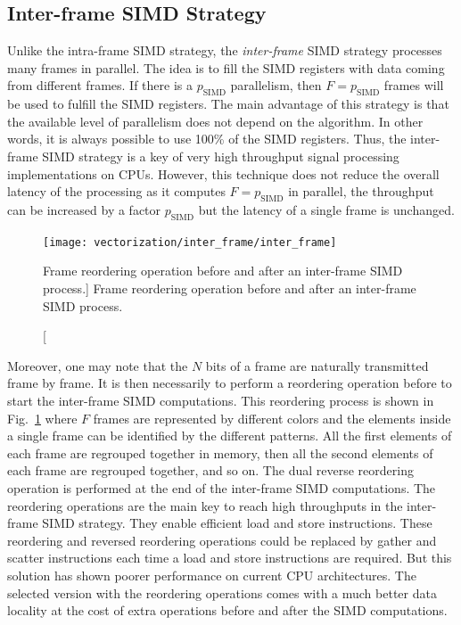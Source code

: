 \subsection{Inter-frame SIMD Strategy}
\label{sec:opt_vec_inter}

Unlike the intra-frame SIMD strategy, the \emph{inter-frame} SIMD strategy
processes many frames in parallel. The idea is to fill the SIMD registers with
data coming from different frames. If there is a $p_\text{SIMD}$ parallelism,
then $F = p_\text{SIMD}$ frames will be used to fulfill the SIMD registers. The
main advantage of this strategy is that the available level of parallelism does
not depend on the algorithm. In other words, it is always possible to use 100\%
of the SIMD registers. Thus, the inter-frame SIMD strategy is a key of very high
throughput signal processing implementations on CPUs. However, this technique
does not reduce the overall latency of the processing as it computes $F =
p_\text{SIMD}$ in parallel, the throughput can be increased by a factor
$p_\text{SIMD}$ but the latency of a single frame is unchanged.

\begin{figure}[htp]
  \centering
  \texttt{[image: vectorization/inter\_frame/inter\_frame]}
  \caption
    [Frame reordering operation before and after an inter-frame SIMD process.]
    {Frame reordering operation before and after an inter-frame SIMD process.}
  \label{fig:opt_vec_inter_frame}
\end{figure}

Moreover, one may note that the $N$ bits of a frame are naturally transmitted
frame by frame. It is then necessarily to perform a reordering operation before
to start the inter-frame SIMD computations. This reordering process is shown in
Fig.~\ref{fig:opt_vec_inter_frame} where $F$ frames are represented by different
colors and the elements inside a single frame can be identified by the different
patterns. All the first elements of each frame are regrouped together in memory,
then all the second elements of each frame are regrouped together, and so on.
The dual reverse reordering operation is performed at the end of the inter-frame
SIMD computations. The reordering operations are the main key to reach high
throughputs in the inter-frame SIMD strategy. They enable efficient load and
store instructions. These reordering and reversed reordering operations could be
replaced by gather and scatter instructions each time a load and store
instructions are required. But this solution has shown poorer performance on
current CPU architectures. The selected version with the reordering operations
comes with a much better data locality at the cost of extra operations before
and after the SIMD computations.

